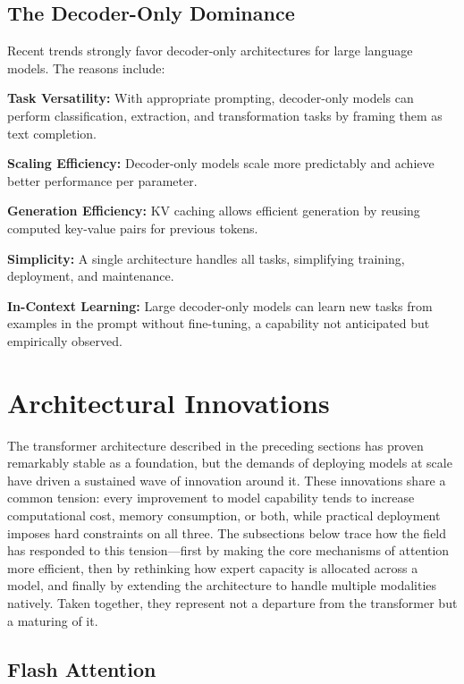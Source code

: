 \documentclass{book}
\begin{document}
\subsection{The Decoder-Only Dominance}

Recent trends strongly favor decoder-only architectures for large language models. The reasons include:

\textbf{Task Versatility:} With appropriate prompting, decoder-only models can perform classification, extraction, and transformation tasks by framing them as text completion.

\textbf{Scaling Efficiency:} Decoder-only models scale more predictably and achieve better performance per parameter.

\textbf{Generation Efficiency:} KV caching allows efficient generation by reusing computed key-value pairs for previous tokens.

\textbf{Simplicity:} A single architecture handles all tasks, simplifying training, deployment, and maintenance.

\textbf{In-Context Learning:} Large decoder-only models can learn new tasks from examples in the prompt without fine-tuning, a capability not anticipated but empirically observed.



\section{Architectural Innovations}

The transformer architecture described in the preceding sections has proven
remarkably stable as a foundation, but the demands of deploying models at
scale have driven a sustained wave of innovation around it. These innovations
share a common tension: every improvement to model capability tends to
increase computational cost, memory consumption, or both, while practical
deployment imposes hard constraints on all three. The subsections below trace
how the field has responded to this tension---first by making the core
mechanisms of attention more efficient, then by rethinking how expert capacity
is allocated across a model, and finally by extending the architecture to
handle multiple modalities natively. Taken together, they represent not a
departure from the transformer but a maturing of it.

\subsection{Flash Attention}
\end{document}
